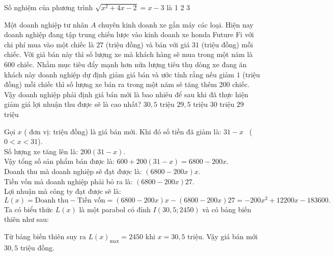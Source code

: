 \begin{ex}
	Số nghiệm của phương trình $\sqrt{x^{2}+4x-2}=x-3$ là
	\choice
	{}
	{1}
	{2}
	{3}
\end{ex}
\begin{ex}%
	Một doanh nghiệp tư nhân $A$ chuyên kinh doanh xe gắn máy các loại. Hiện nay doanh nghiệp đang tập trung chiến lược vào kinh doanh xe honda Future Fi với chi phí mua vào một chiếc là $27$ (triệu đồng) và bán với giá $31$ (triệu đồng) mỗi chiếc. Với giá bán này thì số lượng xe mà khách hàng sẽ mua trong một năm là $600$ chiếc. Nhằm mục tiêu đẩy mạnh hơn nữa lượng tiêu thụ dòng xe đang ăn khách này doanh nghiệp dự định giảm giá bán và ước tính rằng nếu giảm $1$ (triệu đồng) mỗi chiếc thì số lượng xe bán ra trong một năm sẽ tăng thêm $200$ chiếc. Vậy doanh nghiệp phải định giá bán mới là bao nhiêu để sau khi đã thực hiện giảm giá lợi nhuận thu được sẽ là cao nhất?
	\choice
	{\True $30,5$ triệu}
	{$29,5$ triệu}
	{$30$ triệu}
	{$29$ triệu}
	\loigiai
	{
		Gọi $x$ ( đơn vị: triệu đồng) là giá bán mới. Khi đó số tiền đã giảm là: $31-x$ \, ($0<x<31$). \\
		Số lượng xe tăng lên là: $200(31-x)$.\\
		Vậy tổng số sản phẩm bán được là: $600+ 200(31-x ) =6800-200x$.\\
		Doanh thu mà doanh nghiệp sẽ đạt được là: $(6800 -200x)x$.\\
		Tiền vốn mà doanh nghiệp phải bỏ ra là: $(6800 -200x)27$.\\
		Lợi nhuận mà công ty đạt được sẽ là:
		\[L(x)= \text{Doanh thu} -\text{Tiền vốn} =(6800 -200x)x-(6800 -200x)27=-200x^2+12200x-183600.\]
		Ta có biểu thức $L(x)$ là một parabol có đỉnh $I(30,5;2450)$ và có bảng biến thiên như sau:
		\begin{center}
		\end{center}
		Từ bảng biến thiên suy ra $L(x)_{\max} =2450$ khi $x=30,5$ triệu. Vậy giá bán mới $30,5$ triệu đồng.
	}
\end{ex}
